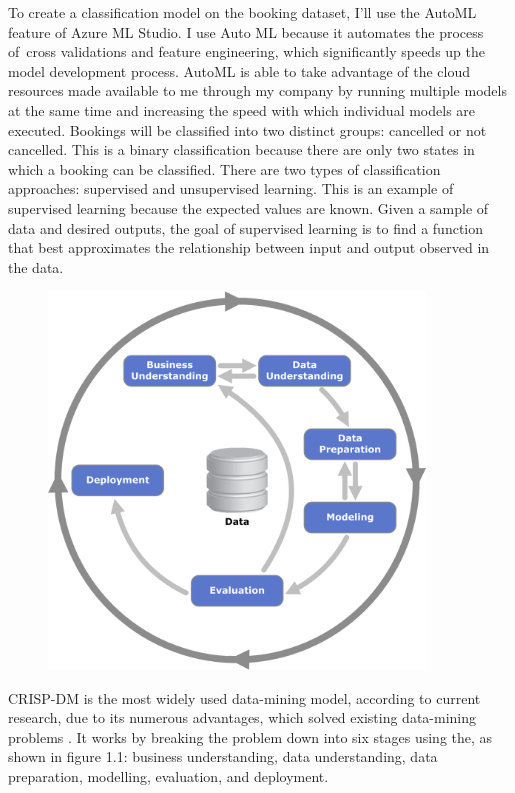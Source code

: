 To create a classification model on the booking dataset, I'll use the AutoML feature of Azure ML Studio. I use Auto ML because it automates the process of cross validations and feature engineering, which significantly speeds up the model development process. AutoML is able to take advantage of the cloud resources made available to me through my company by running multiple models at the same time and increasing the speed with which individual models are executed. Bookings will be classified into two distinct groups: cancelled or not cancelled. This is a binary classification because there are only two states in which a booking can be classified. There are two types of classification approaches: supervised and unsupervised learning. This is an example of supervised learning because the expected values are known. Given a sample of data and desired outputs, the goal of supervised learning is to find a function that best approximates the relationship between input and output observed in the data.

 \begin{figure}[H]
 \includegraphics[width=10cm]{figures/CRISPDM_Process_Diagram.png}
 \caption{}
\end{figure} 


CRISP-DM is the most widely used data-mining model, according to current research, due to its numerous advantages, which solved existing data-mining problems \cite{Wirth2000CRISP-DMMining}. It works by breaking the problem down into six stages using the, as shown in figure 1.1: business understanding, data understanding, data preparation, modelling, evaluation, and deployment.

